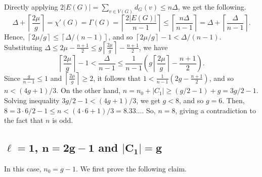 \documentclass[12pt,oneside]{amsart}
\newcommand\roundup[1]{\left\lceil#1\right\rceil}
\begin{document}
Directly applying  $2|E(G)| = \sum_{v\in V(G)} d_G(v) \leq n\Delta$, we get the following.
$$\Delta+ \left\lceil \frac{2\mu}{g}\right\rceil=\chi'(G)=\Gamma(G) =\roundup{\frac {2|E(G)|}{n-1}}\leq \left\lceil \frac{n\Delta}{n-1}\right\rceil=\Delta+\left\lceil\frac{\Delta}{n-1}\right\rceil.$$
Hence, $\roundup{2\mu/g} \le \roundup{\Delta/(n-1)}$, and so $\left\lceil {2\mu/g} \right\rceil -1<{\Delta/(n-1)}$. Substituting  $\Delta\leq 2\mu-\tfrac{n+1}{2} \leq g \roundup{\tfrac{2\mu}g} -\tfrac{n+1}2$, we have
\begin{equation}\label{eq: nDelta}
\left\lceil \frac{2\mu}{g} \right\rceil -1< \frac{\Delta}{n-1}\le \frac{1}{n-1} \left(g\roundup{\frac{2\mu}g} -\frac{n+1}2\right).
\end{equation}
Since $\frac{g} {n-1}\le 1$ and $\roundup{\frac{2\mu}g} \ge 2$,
it follows that
$1< \frac{1}{n-1}(2g -\frac{n+1}2)$, and so $n < (4g+1)/3$.
On the other hand, $n = n_0 +|C_1| \geq (g/2-1) +g = 3g/2 -1$. Solving inequality  $3g/2 -1 <  (4g+1)/3$,  we get $g < 8$, and so $g=6$. Then, $8 =3\cdot 6/2 -1 \le n < (4\cdot 6+1)/3 =8.33\dots $. So, $n=8$, giving a contradiction  to the fact that $n$ is odd.



\subsection{\texorpdfstring{${\mathbf{\ell= 1}}$}{l=1}, \texorpdfstring{${\mathbf{n=2g-1}}$}{n=2g-1} and \texorpdfstring{$\mathbf{ |C_1| =g}$}{|C1|=g} } In this case, $n_0=g-1$.  We first prove the following claim.
\end{document}
